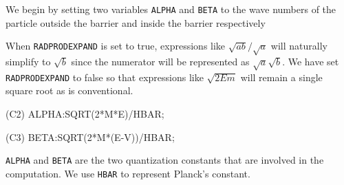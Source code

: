 We begin by setting two variables {\tt ALPHA} and {\tt BETA} to the wave
numbers of the particle outside the barrier and inside the barrier respectively
When {\tt RADPRODEXPAND} is set to true, expressions like $ /
$ will naturally simplify to $$ since the numerator will be
represented as $ $.  We have set {\tt RADPRODEXPAND} to
false so that expressions like $$ will remain a single square
root as is conventional.
\begin{code}
(C2) ALPHA:SQRT(2*M*E)/HBAR;
\end{code}
\begin{code}
(C3) BETA:SQRT(2*M*(E-V))/HBAR;
\end{code}
{\tt ALPHA} and {\tt BETA} are the two quantization constants that are
involved in the computation.  We use {\tt HBAR} to represent Planck's
constant.

